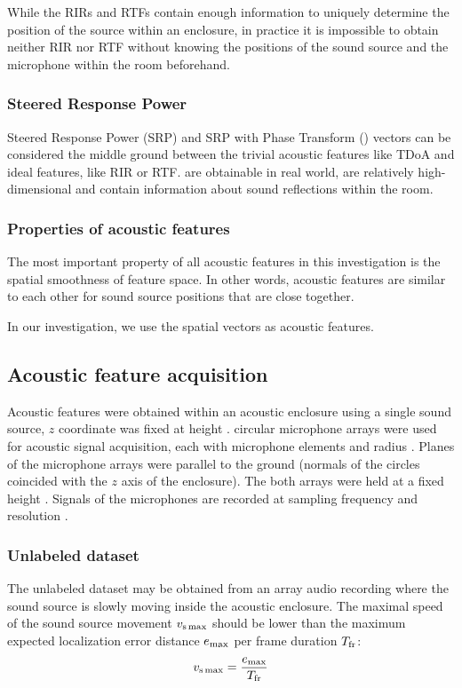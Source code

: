 \documentclass[applsci,article,submit,moreauthors,pdftex]{Definitions/mdpi}
\begin{document}
While the RIRs and RTFs contain enough information to uniquely determine the position of the source within an enclosure, in practice it is impossible to obtain neither RIR nor RTF without knowing the positions of the sound source and the microphone within the room beforehand.

\subsubsection{Steered Response Power}
Steered Response Power (SRP) and SRP with Phase Transform (\srpphat{}) vectors can be considered the middle ground between the trivial acoustic features like TDoA and ideal features, like RIR or RTF. 
\srpphat{} are obtainable in real world, are relatively high-dimensional and contain information about sound reflections within the room.

\subsubsection{Properties of acoustic features}
The most important property of all acoustic features in this investigation is the spatial smoothness of feature space. In other words, acoustic features are similar to each other for sound source positions that are close together.

In our investigation, we use the \srpphat{} spatial vectors as acoustic features.

\subsection{Acoustic feature acquisition}
Acoustic features were obtained within an acoustic enclosure using a single sound source, $ z $ coordinate was fixed at height \hsrc{}. \Narr{} circular microphone arrays were used for acoustic signal acquisition, each with \Nmic{} microphone elements and radius \rarr{}.
Planes of the microphone arrays were parallel to the ground (normals of the circles coincided with the $ z $ axis of the enclosure).
The both arrays were held at a fixed height \harr{}.
Signals of the microphones are recorded at sampling frequency \fs{} and resolution \resolution{}.


\subsubsection{Unlabeled dataset}
The unlabeled dataset may be obtained from an array audio recording where the sound source is slowly moving inside the acoustic enclosure. The maximal speed of the sound source movement $ v_{\mathrm{s}\max} $ should be lower than the maximum expected localization error distance $ e_{\max} $ per frame duration $ T_{\mathrm{fr}} $:
\begin{equation}\label{eq:unlabeled_src_max_speed}
v_{\mathrm{s}\max}  = \frac{e_{\max}}{T_{\mathrm{fr}}}
\end{equation} 
\end{document}
